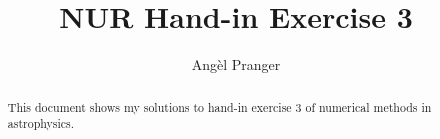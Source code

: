\documentclass[a4paper,10pt]{article}
\title{NUR Hand-in Exercise 3}
\author{Angèl Pranger}
\begin{document}
\maketitle

\begin{abstract}
This document shows my solutions to hand-in exercise 3 of numerical methods in astrophysics.
\end{abstract}


\end{document}
